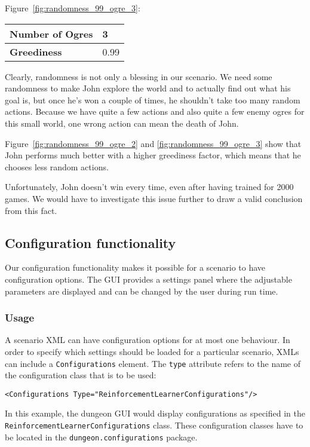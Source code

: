 \documentclass[a4paper,10pt]{scrartcl}
\begin{document}
Figure~\ref{fig:randomness_99_ogre_3}:
\begin{center}
\begin{tabular}{|l|l|}
\hline
\textbf{Number of Ogres} & 3 \\
\hline
\textbf{Greediness} & 0.99 \\
\hline
\end{tabular}
\end{center}


Clearly, randomness is not only a blessing in our scenario. We need some randomness to make John explore the world and to actually find out what his goal is, but once he's won a couple of times, he shouldn't take too many random actions. Because we have quite a few actions and also quite a few enemy ogres for this small world, one wrong action can mean the death of John. 

Figure~\ref{fig:randomness_99_ogre_2} and \ref{fig:randomness_99_ogre_3} show that John performs much better with a higher greediness factor, which means that he chooses less random actions.

Unfortunately, John doesn't win every time, even after having trained for 2000 games. We would have to investigate this issue further to draw a valid conclusion from this fact. 

\subsection{Configuration functionality}
Our configuration functionality makes it possible for a scenario to have configuration options. The GUI provides a settings panel where the adjustable parameters are displayed and can be changed by the user during run time.

\subsubsection{Usage}
A scenario XML can have configuration options for at most one behaviour. In order to specify which settings should be loaded for a particular scenario, XMLs can include a \verb|Configurations| element. The \verb|type| attribute refers to the name of the configuration class that is to be used:
\begin{verbatim}
<Configurations Type="ReinforcementLearnerConfigurations"/>
\end{verbatim}
In this example, the dungeon GUI would display configurations as specified in the  \verb|ReinforcementLearnerConfigurations| class. These configuration classes have to be located in the \verb|dungeon.configurations| package.
\end{document}
